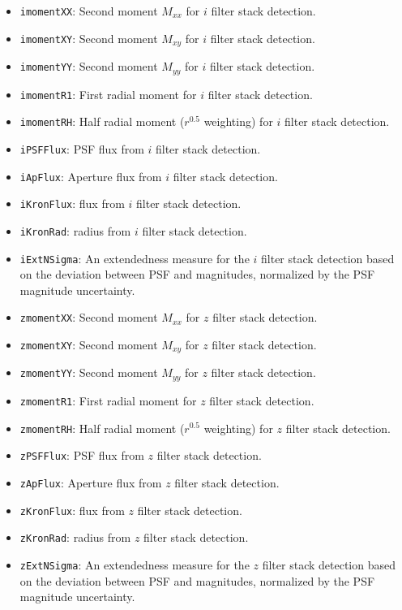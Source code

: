\documentclass[twocolumn]{aastex63}
\begin{document}
\begin{itemize}
    \item \texttt{imomentXX}: Second moment $M_{xx}$ for $i$ filter stack detection. 
    \item \texttt{imomentXY}: Second moment $M_{xy}$ for $i$ filter stack detection. 
    \item \texttt{imomentYY}: Second moment $M_{yy}$ for $i$ filter stack detection. 
    \item \texttt{imomentR1}: First radial moment for $i$ filter stack detection.
    \item \texttt{imomentRH}: Half radial moment ($r^{0.5}$ weighting) for $i$ filter stack detection.
    \item \texttt{iPSFFlux}: PSF flux from $i$ filter stack detection.
    \item \texttt{iApFlux}: Aperture flux from $i$ filter stack detection.
    \item \texttt{iKronFlux}: \cite{Kron1980} flux from $i$ filter stack detection.
    \item \texttt{iKronRad}: \cite{Kron1980} radius from $i$ filter stack detection.
    \item \texttt{iExtNSigma}: An extendedness measure for the $i$ filter stack detection based on the deviation between PSF and \cite{Kron1980} magnitudes, normalized by the PSF magnitude uncertainty.
    \item \texttt{zmomentXX}: Second moment $M_{xx}$ for $z$ filter stack detection. 
    \item \texttt{zmomentXY}: Second moment $M_{xy}$ for $z$ filter stack detection. 
    \item \texttt{zmomentYY}: Second moment $M_{yy}$ for $z$ filter stack detection. 
    \item \texttt{zmomentR1}: First radial moment for $z$ filter stack detection.
    \item \texttt{zmomentRH}: Half radial moment ($r^{0.5}$ weighting) for $z$ filter stack detection.
    \item \texttt{zPSFFlux}: PSF flux from $z$ filter stack detection.
    \item \texttt{zApFlux}: Aperture flux from $z$ filter stack detection.
    \item \texttt{zKronFlux}: \cite{Kron1980} flux from $z$ filter stack detection.
    \item \texttt{zKronRad}: \cite{Kron1980} radius from $z$ filter stack detection.
    \item \texttt{zExtNSigma}: An extendedness measure for the $z$ filter stack detection based on the deviation between PSF and \cite{Kron1980} magnitudes, normalized by the PSF magnitude uncertainty.

\end{itemize}
\end{document}
